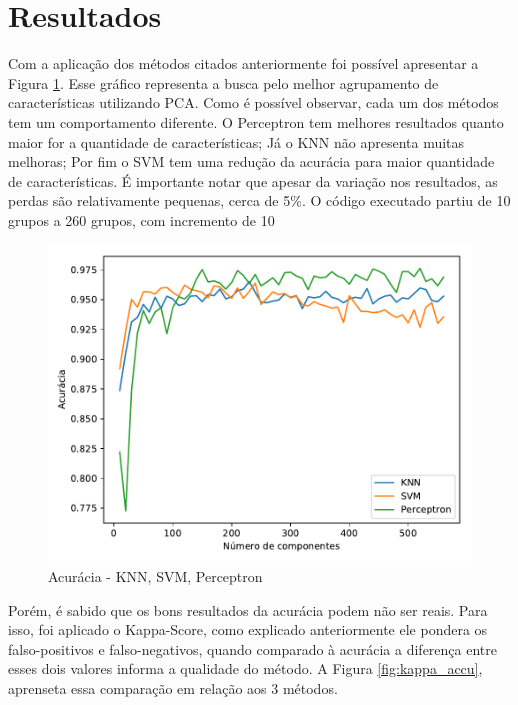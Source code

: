 \documentclass[12pt]{article}
\begin{document}
\section{Resultados}
	Com a aplicação dos métodos citados anteriormente foi possível apresentar a Figura \ref{fig:todos}. Esse gráfico representa a busca pelo melhor agrupamento de características utilizando PCA. Como é possível observar, cada um dos métodos tem um comportamento diferente. O Perceptron tem melhores resultados quanto maior for a quantidade de características; Já o KNN não apresenta muitas melhoras; Por fim o SVM tem uma redução da acurácia para maior quantidade de características. É importante notar que apesar da variação nos resultados, as perdas são relativamente pequenas, cerca de 5\%. O código executado partiu de 10 grupos a 260 grupos, com incremento de 10
	\begin{figure}[!htb]
	\centering
	\includegraphics[width=.5\textwidth]{Todos.pdf}
	\caption{Acurácia - KNN, SVM, Perceptron}
	\label{fig:todos}
	\end{figure}
	Porém, é sabido que os bons resultados da acurácia podem não ser reais. Para isso, foi aplicado o Kappa-Score, como explicado anteriormente ele pondera os falso-positivos e falso-negativos, quando comparado à acurácia a diferença entre esses dois valores informa a qualidade do método. A Figura \ref{fig:kappa_accu}, aprenseta essa comparação em relação aos 3 métodos.
\end{document}

